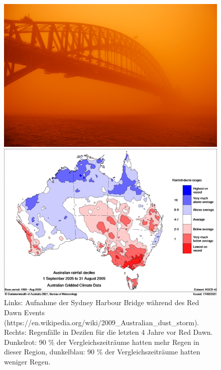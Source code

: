 \documentclass[12pt,a4paper,onecolumn]{scrartcl}
\begin{document}
\begin{figure}[!htb]
	\begin{minipage}[c]{0.5\textwidth}
		\includegraphics[width=\textwidth]{bilder/reddawn/SHB.jpg}
	\end{minipage}\hfill
	\begin{minipage}[c]{0.49\textwidth}
		\includegraphics[width=\textwidth]{bilder/reddawn/drought.png}
	\end{minipage}\hfill
	\caption{Links: Aufnahme der Sydney Harbour Bridge während des Red Dawn Events (https://en.wikipedia.org/wiki/2009_Australian_dust_storm). Rechts: Regenfälle in Dezilen für die letzten 4 Jahre vor Red Dawn. Dunkelrot: 90 \% der Vergleichszeiträume hatten mehr Regen in dieser Region, dunkelblau: 90 \% der Vergleichszeiträume hatten weniger Regen.} \label{fig:reddawn}
\end{figure}
\end{document}
